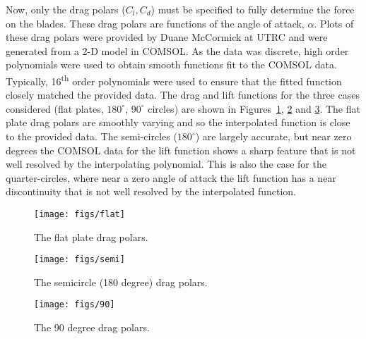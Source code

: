 Now, only the drag polars ($C_l,C_d$) must be specified to fully
determine the force on the blades. These drag polars are functions of
the angle of attack, $\alpha$. Plots of these drag polars were provided
by Duane McCormick at UTRC and were generated from a 2-D model in
COMSOL. As the data was discrete, high order polynomials were used
to obtain smooth functions fit to the COMSOL data. Typically,
16\textsuperscript{th} order polynomials were used to 
ensure that the fitted function closely matched the provided
data. The drag and lift functions for the three cases considered (flat
plates, $180^{\circ}$, $90^{\circ}$ circles) are shown in 
Figures~\ref{fig:flat_plate_drag}, \ref{fig:semi_drag} and
\ref{fig:90_drag}. The flat plate drag polars are smoothly
varying and so the interpolated function is close to the provided
data. The semi-circles ($180^{\circ}$) are largely accurate, but near
zero degrees the COMSOL data for the lift function shows a sharp feature
that is not well resolved by the interpolating polynomial. This is also
the case for the quarter-circles, where near a zero angle of attack the
lift function has a near discontinuity that is not well resolved by the
interpolated function. 


\begin{figure}[!htb]
  \begin{center}
    \texttt{[image: figs/flat]}
    \caption{The flat plate drag polars.} 
    \label{fig:flat_plate_drag}
  \end{center}
\end{figure}

\begin{figure}[!htb]
  \begin{center}
    \texttt{[image: figs/semi]}
    \caption{The semicircle (180 degree) drag polars.} 
    \label{fig:semi_drag}
  \end{center}
\end{figure}

\begin{figure}[!htb]
  \begin{center}
    \texttt{[image: figs/90]}
    \caption{The 90 degree drag polars.} 
    \label{fig:90_drag}
  \end{center}
\end{figure}


